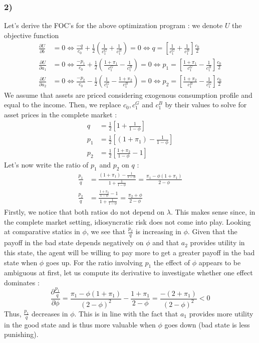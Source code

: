 \documentclass{article}
\begin{document}
\subsubsection{2)}
Let's derive the FOC's for the above optimization program : we denote $U$ the objective function
$$\begin{aligned}
    \frac{\partial U}{\partial b} &= 0 \Leftrightarrow \frac{-q}{c_0}+\frac{1}{2} (\frac{1}{c_1^G}+\frac{1}{c_1^B}) =0 \Leftrightarrow q = [\frac{1}{c_1^G}+\frac{1}{c_1^B}]\frac{c_0}{2}\\
     \frac{\partial U}{\partial a_1} &= 0 \Leftrightarrow \frac{-p_1}{c_0}+\frac{1}{2}(\frac{1+\pi_1}{c_1^G}-\frac{1}{c_1^B}) = 0 \Leftrightarrow p_1 = [\frac{1+\pi_1}{c_1^G}-\frac{1}{c_1^B}]\frac{c_0}{2}\\
     \frac{\partial U}{\partial a_2} &= 0 \Leftrightarrow \frac{-p_2}{c_0}-\frac{1}{2}(\frac{1}{c_1^G}-\frac{1+\pi_2}{c_1^B})=0\Leftrightarrow p_2 = [\frac{1+\pi_2}{c_1^B}-\frac{1}{c_1^G}]\frac{c_0}{2}
\end{aligned}$$
We assume that assets are priced considering exogenous consumption profile and equal to the income. Then, we replace $c_0,c_1^G$ and $c_1^B$ by their values to solve for asset prices in the complete market : 
$$\begin{aligned}
    q &= \frac{1}{2}[1+\frac{1}{1-\phi}]\\
    p_1 &= \frac{1}{2}[(1+\pi_1)-\frac{1}{1-\phi}]\\
    p_2 &= \frac{1}{2}[\frac{1+\pi_2}{1-\phi}-1]
\end{aligned}$$
Let's now write the ratio of $p_1$ and $p_2$ on $q$ : 
$$\begin{aligned}
    \frac{p_1}{q} &= \frac{(1+\pi_1)-\frac{1}{1-\phi}}{1+\frac{1}{1-\phi}}=\frac{\pi_1-\phi(1+\pi_1)}{2-\phi}\\
    \frac{p_2}{q} &= \frac{\frac{1+\pi_2}{1-\phi}-1}{1+\frac{1}{1-\phi}} =\frac{\pi_2+\phi}{2-\phi}
\end{aligned}$$
Firstly, we notice that both ratios do not depend on $\lambda$. This makes sense since, in the complete market setting, idiosyncratic risk does not come into play. Looking at comparative statics in $\phi$, we see that $\frac{p_2}{q}$ is increasing in $\phi$. Given that the payoff in the bad state depends negatively on $\phi$ and that $a_2$ provides utility in this state, the agent will be willing to pay more to get a greater payoff in the bad state when $\phi$ goes up. 
For the ratio involving $p_1$ the effect of $\phi$ appears to be ambiguous at first, let us compute its derivative to investigate whether one effect dominates : 
$$\frac{\partial \frac{p_1}{q}}{\partial \phi} = \frac{\pi_1-\phi(1+\pi_1)}{(2-\phi)^2}-\frac{1+\pi_1}{2-\phi} = \frac{-(2+\pi_1)}{(2-\phi)^2 }<0$$
Thus, $\frac{p_1}{q}$ decreases in $\phi$. This is in line with the fact that $a_1$ provides more utility in the good state and is thus more valuable when $\phi$ goes down (bad state is less punishing). 
\end{document}
